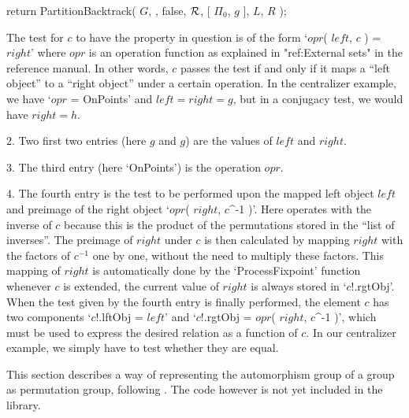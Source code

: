 \) return PartitionBacktrack( $G$,
\) \quad [ $g$, $g$,
\)\kernttindent 3 \qquad OnPoints,
\)\kernttindent 4 \qquad $c$ -> $c$!.lftObj = $c$!.rgtObj ],
\) \quad false, ${\cal R}$, [ $\Pi_0$, $g$ ], $L$, $R$ );

The test for $c$ to have the property in question  is of the form `$opr$(
$left$,  $c$  )  =  $right$' where  $opr$   is an  operation  function as
explained in "ref:External sets" in the reference manual. In other words,
$c$ passes the test if and only if it maps a ``left object'' to a ``right
object'' under  a certain operation. In  the centralizer example, we have
`$opr$ =  OnPoints' and $left = right  = g$, but  in a conjugacy test, we
would have $right = h$.

\beginlist%

\item{2.}
Two first two entries (here $g$ and $g$) are the  values  of  $left$  and
$right$.

\item{3.}
The third entry (here `OnPoints') is the operation $opr$.

\item{4.}
The fourth entry is the test to be performed upon the mapped left  object
$left$ and preimage of the right object `$opr$( $right$, $c$^-1 )'.  Here
{\GAP} operates with the inverse of $c$ because this is  the  product  of
the permutations stored in the ``list  of  inverses''.  The  preimage  of
$right$ under $c$ is then calculated by mapping $right$ with the  factors
of $c^{-1}$ one by one, without the need to multiply these factors.  This
mapping  of  $right$  is  automatically  done  by  the  `ProcessFixpoint'
function whenever $c$ is extended, the current value of $right$ is always
stored in `$c$!.rgtObj'. When the test  given  by  the  fourth  entry  is
finally performed, the element $c$  has  two  components  `$c$!.lftObj  =
$left$' and `$c$!.rgtObj = $opr$( $right$, $c$^-1 )', which must be  used
to express the desired relation as a function of $c$. In our  centralizer
example, we simply have to test whether they are equal.

\endlist

\endgroup%


This section describes a way of representing the automorphism group of a
group as permutation group, following \cite{Sims97}. The code however is
not yet included in the {\GAP} library.

